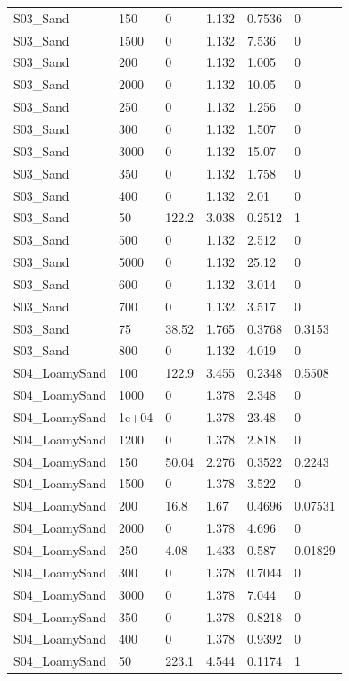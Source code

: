 {\begin{longtable}
{}S03\_Sand & 150 & 0 & 1.132 & 0.7536 & 0\\
{}S03\_Sand & 1500 & 0 & 1.132 & 7.536 & 0\\
{}S03\_Sand & 200 & 0 & 1.132 & 1.005 & 0\\
{}S03\_Sand & 2000 & 0 & 1.132 & 10.05 & 0\\
{}S03\_Sand & 250 & 0 & 1.132 & 1.256 & 0\\
{}S03\_Sand & 300 & 0 & 1.132 & 1.507 & 0\\
{}S03\_Sand & 3000 & 0 & 1.132 & 15.07 & 0\\
{}S03\_Sand & 350 & 0 & 1.132 & 1.758 & 0\\
{}S03\_Sand & 400 & 0 & 1.132 & 2.01 & 0\\
{}S03\_Sand & 50 & 122.2 & 3.038 & 0.2512 & 1\\
{}S03\_Sand & 500 & 0 & 1.132 & 2.512 & 0\\
{}S03\_Sand & 5000 & 0 & 1.132 & 25.12 & 0\\
{}S03\_Sand & 600 & 0 & 1.132 & 3.014 & 0\\
{}S03\_Sand & 700 & 0 & 1.132 & 3.517 & 0\\
{}S03\_Sand & 75 & 38.52 & 1.765 & 0.3768 & 0.3153\\
{}S03\_Sand & 800 & 0 & 1.132 & 4.019 & 0\\
{}S04\_LoamySand & 100 & 122.9 & 3.455 & 0.2348 & 0.5508\\
{}S04\_LoamySand & 1000 & 0 & 1.378 & 2.348 & 0\\
{}S04\_LoamySand & 1e+04 & 0 & 1.378 & 23.48 & 0\\
{}S04\_LoamySand & 1200 & 0 & 1.378 & 2.818 & 0\\
{}S04\_LoamySand & 150 & 50.04 & 2.276 & 0.3522 & 0.2243\\
{}S04\_LoamySand & 1500 & 0 & 1.378 & 3.522 & 0\\
{}S04\_LoamySand & 200 & 16.8 & 1.67 & 0.4696 & 0.07531\\
{}S04\_LoamySand & 2000 & 0 & 1.378 & 4.696 & 0\\
{}S04\_LoamySand & 250 & 4.08 & 1.433 & 0.587 & 0.01829\\
{}S04\_LoamySand & 300 & 0 & 1.378 & 0.7044 & 0\\
{}S04\_LoamySand & 3000 & 0 & 1.378 & 7.044 & 0\\
{}S04\_LoamySand & 350 & 0 & 1.378 & 0.8218 & 0\\
{}S04\_LoamySand & 400 & 0 & 1.378 & 0.9392 & 0\\
{}S04\_LoamySand & 50 & 223.1 & 4.544 & 0.1174 & 1\\

\end{longtable}}

